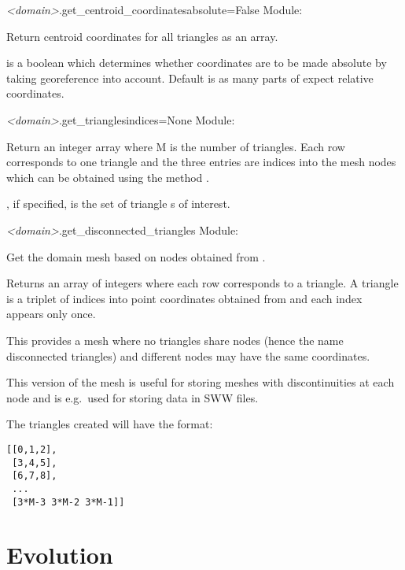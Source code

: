 \documentclass{manual}
\begin{document}
\begin{methoddesc}{\emph{<domain>}.get_centroid_coordinates}{absolute=False}
Module: 

Return centroid coordinates for all triangles as an  array.

 is a boolean which determines whether coordinates
are to be made absolute by taking georeference into account.
Default is  as many parts of \anuga expect relative coordinates.
\end{methoddesc}

\begin{methoddesc}{\emph{<domain>}.get_triangles}{indices=None}
Module: 

Return an  integer array where M is the number of triangles.
Each row corresponds to one triangle and the three entries are
indices into the mesh nodes which can be obtained using the method
.

, if specified, is the set of triangle s of interest.
\end{methoddesc}

\begin{methoddesc}{\emph{<domain>}.get_disconnected_triangles}{}
Module: 

Get the domain mesh based on nodes obtained from .

Returns an  array of integers where each row corresponds to
a triangle. A triangle is a triplet of indices into
point coordinates obtained from  and each
index appears only once.

This provides a mesh where no triangles share nodes
(hence the name disconnected triangles) and different
nodes may have the same coordinates.

This version of the mesh is useful for storing meshes with
discontinuities at each node and is e.g.\ used for storing
data in SWW files.

The triangles created will have the format:

\begin{verbatim}
[[0,1,2],
 [3,4,5],
 [6,7,8],
 ...
 [3*M-3 3*M-2 3*M-1]]
\end{verbatim}
\end{methoddesc}

\section{Evolution}
\label{sec:evolution}
\end{document}
